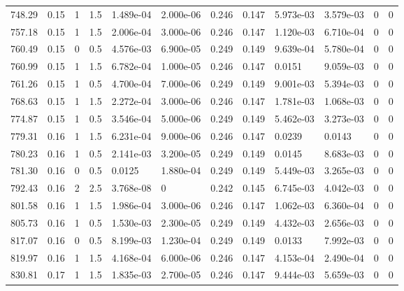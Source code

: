 \documentclass[preview]{standalone}
\begin{document}
{{{\begin{tabular}{L{1.2cm}C{1.2cm} C{0.3cm}C{0.5cm} C{1.4cm}C{1.4cm} C{1.4cm}C{1.4cm} C{1.6cm}C{1.6cm} C{1.6cm}C{1.6cm}}
  748.29  &  0.15  & 1     & 1.5 &  1.489e-04  & 2.000e-06  &  0.246&   0.147& 5.973e-03 & 3.579e-03   &  0 & 0  \\ 
  757.18  &  0.15  & 1     & 1.5 &  2.006e-04  & 3.000e-06  &  0.246&   0.147& 1.120e-03 & 6.710e-04   &  0 & 0  \\ 
  760.49  &  0.15  & 0     & 0.5 &  4.576e-03  & 6.900e-05  &  0.249&   0.149& 9.639e-04 & 5.780e-04   &  0 & 0  \\ 
  760.99  &  0.15  & 1     & 1.5 &  6.782e-04  & 1.000e-05  &  0.246&   0.147& 0.0151 & 9.059e-03   &  0 & 0  \\ 
  761.26  &  0.15  & 1     & 0.5 &  4.700e-04  & 7.000e-06  &  0.249&   0.149& 9.001e-03 & 5.394e-03   &  0 & 0  \\ 
  768.63  &  0.15  & 1     & 1.5 &  2.272e-04  & 3.000e-06  &  0.246&   0.147& 1.781e-03 & 1.068e-03   &  0 & 0  \\ 
  774.87  &  0.15  & 1     & 0.5 &  3.546e-04  & 5.000e-06  &  0.249&   0.149& 5.462e-03 & 3.273e-03   &  0 & 0  \\ 
  779.31  &  0.16  & 1     & 1.5 &  6.231e-04  & 9.000e-06  &  0.246&   0.147& 0.0239 & 0.0143   &  0 & 0  \\ 
  780.23  &  0.16  & 1     & 0.5 &  2.141e-03  & 3.200e-05  &  0.249&   0.149& 0.0145 & 8.683e-03   &  0 & 0  \\ 
  781.30  &  0.16  & 0     & 0.5 &  0.0125  & 1.880e-04  &  0.249&   0.149& 5.449e-03 & 3.265e-03   &  0 & 0  \\ 
  792.43  &  0.16  & 2     & 2.5 &  3.768e-08  & 0  &  0.242&   0.145& 6.745e-03 & 4.042e-03   &  0 & 0  \\ 
  801.58  &  0.16  & 1     & 1.5 &  1.986e-04  & 3.000e-06  &  0.246&   0.147& 1.062e-03 & 6.360e-04   &  0 & 0  \\ 
  805.73  &  0.16  & 1     & 0.5 &  1.530e-03  & 2.300e-05  &  0.249&   0.149& 4.432e-03 & 2.656e-03   &  0 & 0  \\ 
  817.07  &  0.16  & 0     & 0.5 &  8.199e-03  & 1.230e-04  &  0.249&   0.149& 0.0133 & 7.992e-03   &  0 & 0  \\ 
  819.97  &  0.16  & 1     & 1.5 &  4.168e-04  & 6.000e-06  &  0.246&   0.147& 4.153e-04 & 2.490e-04   &  0 & 0  \\ 
  830.81  &  0.17  & 1     & 1.5 &  1.835e-03  & 2.700e-05  &  0.246&   0.147& 9.444e-03 & 5.659e-03   &  0 & 0  \\ 
\hline 
\end{tabular} 

}}}
\end{document}
